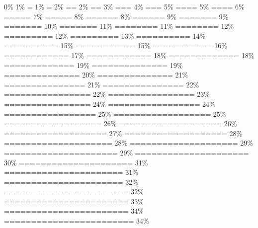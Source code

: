 \documentclass[
]{article}
\begin{document}
\textbar{} \textbar{} \textbar{} 0\% \textbar{} \textbar{} \textbar{}
1\% \textbar{} \textbar= \textbar{} 1\% \textbar{} \textbar= \textbar{}
2\% \textbar{} \textbar== \textbar{} 2\% \textbar{} \textbar==
\textbar{} 3\% \textbar{} \textbar=== \textbar{} 4\% \textbar{}
\textbar=== \textbar{} 5\% \textbar{} \textbar==== \textbar{} 5\%
\textbar{} \textbar==== \textbar{} 6\% \textbar{} \textbar=====
\textbar{} 7\% \textbar{} \textbar===== \textbar{} 8\% \textbar{}
\textbar====== \textbar{} 8\% \textbar{} \textbar====== \textbar{} 9\%
\textbar{} \textbar======= \textbar{} 9\% \textbar{} \textbar=======
\textbar{} 10\% \textbar{} \textbar======= \textbar{} 11\% \textbar{}
\textbar======== \textbar{} 11\% \textbar{} \textbar======== \textbar{}
12\% \textbar{} \textbar========= \textbar{} 12\% \textbar{}
\textbar========= \textbar{} 13\% \textbar{} \textbar==========
\textbar{} 14\% \textbar{} \textbar========== \textbar{} 15\% \textbar{}
\textbar=========== \textbar{} 15\% \textbar{} \textbar===========
\textbar{} 16\% \textbar{} \textbar============ \textbar{} 17\%
\textbar{} \textbar============ \textbar{} 18\% \textbar{}
\textbar============= \textbar{} 18\% \textbar{} \textbar=============
\textbar{} 19\% \textbar{} \textbar============== \textbar{} 19\%
\textbar{} \textbar============== \textbar{} 20\% \textbar{}
\textbar============== \textbar{} 21\% \textbar{}
\textbar=============== \textbar{} 21\% \textbar{}
\textbar=============== \textbar{} 22\% \textbar{}
\textbar================ \textbar{} 22\% \textbar{}
\textbar================ \textbar{} 23\% \textbar{}
\textbar================ \textbar{} 24\% \textbar{}
\textbar================= \textbar{} 24\% \textbar{}
\textbar================= \textbar{} 25\% \textbar{}
\textbar================== \textbar{} 25\% \textbar{}
\textbar================== \textbar{} 26\% \textbar{}
\textbar=================== \textbar{} 26\% \textbar{}
\textbar=================== \textbar{} 27\% \textbar{}
\textbar=================== \textbar{} 28\% \textbar{}
\textbar==================== \textbar{} 28\% \textbar{}
\textbar==================== \textbar{} 29\% \textbar{}
\textbar===================== \textbar{} 29\% \textbar{}
\textbar===================== \textbar{} 30\% \textbar{}
\textbar===================== \textbar{} 31\% \textbar{}
\textbar====================== \textbar{} 31\% \textbar{}
\textbar====================== \textbar{} 32\% \textbar{}
\textbar======================= \textbar{} 32\% \textbar{}
\textbar======================= \textbar{} 33\% \textbar{}
\textbar======================= \textbar{} 34\% \textbar{}
\textbar======================== \textbar{} 34\% \textbar{}
\end{document}
